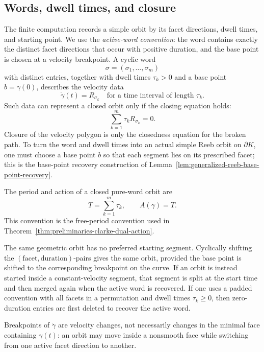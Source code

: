 \subsection{Words, dwell times, and closure}
\label{subsec:generalized-reeb-orbits-polytopes-words}

The finite computation records a simple orbit by its facet directions, dwell
times, and starting point. We use the \emph{active-word convention}: the word
contains exactly the distinct facet directions that occur with positive
duration, and the base point is chosen at a velocity breakpoint. A cyclic word
\[
  \sigma=(\sigma_1,\ldots,\sigma_m)
\]
with distinct entries, together with dwell times \(\tau_k>0\) and a base point
\(b=\gamma(0)\), describes the velocity data
\[
  \dot{\gamma}(t)=R_{\sigma_k}
  \quad\text{for a time interval of length }\tau_k.
\]
Such data can represent a closed orbit only if the closing equation holds:
\begin{equation}\label{eq:generalized-reeb-closure}
  \sum_{k=1}^m \tau_k R_{\sigma_k}=0.
\end{equation}
Closure of the velocity polygon is only the closedness equation for the broken
path. To turn the word and dwell times into an actual simple Reeb orbit on
\(\partial K\), one must choose a base point \(b\) so that each segment lies on
its prescribed facet; this is the base-point recovery construction of
Lemma~\ref{lem:generalized-reeb-base-point-recovery}.

The period and action of a closed pure-word orbit are
\[
  T=\sum_{k=1}^m \tau_k,
  \qquad
  A(\gamma)=T.
\]
This convention is the free-period convention used in
Theorem~\ref{thm:preliminaries-clarke-dual-action}.

The same geometric orbit has no preferred starting segment. Cyclically shifting
the \((\text{facet},\text{duration})\)-pairs gives the same orbit, provided the
base point is shifted to the corresponding breakpoint on the curve. If an orbit
is instead started inside a constant-velocity segment, that segment is split at
the start time and then merged again when the active word is recovered. If one
uses a padded convention with all facets in a permutation and dwell times
\(\tau_k\geq0\), then zero-duration entries are first deleted to recover the
active word.

Breakpoints of \(\dot{\gamma}\) are velocity changes, not necessarily changes
in the minimal face containing \(\gamma(t)\): an orbit may move inside a
nonsmooth face while switching from one active facet direction to another.

